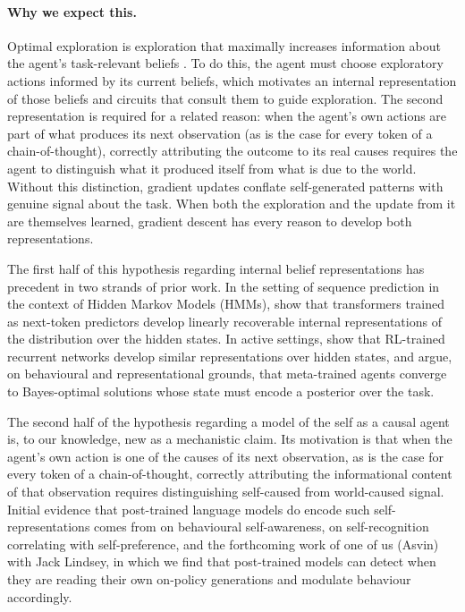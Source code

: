 \documentclass[11pt]{article}
\begin{document}
\paragraph{Why we expect this.} Optimal exploration is exploration that maximally increases information about the agent's task-relevant beliefs \citep{russo2014ids}. To do this, the agent must choose exploratory actions informed by its current beliefs, which motivates an internal representation of those beliefs and circuits that consult them to guide exploration. The second representation is required for a related reason: when the agent's own actions are part of what produces its next observation (as is the case for every token of a chain-of-thought), correctly attributing the outcome to its real causes requires the agent to distinguish what it produced itself from what is due to the world. Without this distinction, gradient updates conflate self-generated patterns with genuine signal about the task. When both the exploration and the update from it are themselves learned, gradient descent has every reason to develop both representations.

The first half of this hypothesis regarding internal belief representations has precedent in two strands of prior work. In the setting of sequence prediction in the context of Hidden Markov Models (HMMs), \citet{shai2024belief} show that transformers trained as next-token predictors develop linearly recoverable internal representations of the distribution over the hidden states. In active settings, \citet{hennig2023emergence} show that RL-trained recurrent networks develop similar representations over hidden states, and \citet{mikulik2020bayesopt,ortega2019meta} argue, on behavioural and representational grounds, that meta-trained agents converge to Bayes-optimal solutions whose state must encode a posterior over the task.

The second half of the hypothesis regarding a model of the self as a causal agent is, to our knowledge, new as a mechanistic claim. Its motivation is that when the agent's own action is one of the causes of its next observation, as is the case for every token of a chain-of-thought, correctly attributing the informational content of that observation requires distinguishing self-caused from world-caused signal. Initial evidence that post-trained language models do encode such self-representations comes from \citet{betley2025tellme} on behavioural self-awareness, \citet{panickssery2024self} on self-recognition correlating with self-preference, and the forthcoming work of one of us (Asvin) with Jack Lindsey, in which we find that post-trained models can detect when they are reading their own on-policy generations and modulate behaviour accordingly. 
\end{document}
